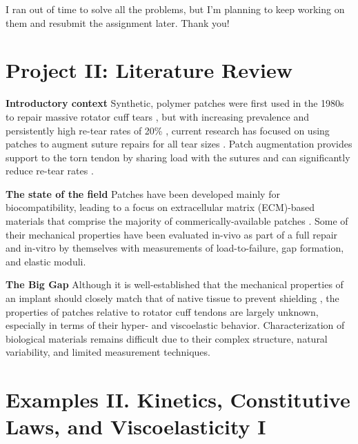 \documentclass{article}
\begin{document}
I ran out of time to solve all the problems, but I'm planning to keep working on them and resubmit the assignment later. Thank you!

\newpage


\section*{Project II: Literature Review}

\begin{outline}
    \1 \textbf{Introductory context}
        \2 Synthetic, polymer patches were first used in the 1980s to repair massive rotator cuff tears \cite{ozaki1986reconstruction}, but with increasing prevalence \cite{yamaguchi2006demographic} and persistently high re-tear rates of 20\% \cite{longo2021retear}, current research has focused on using patches to augment suture repairs for all tear sizes \cite{cobb2022rotator}. Patch augmentation provides support to the torn tendon by sharing load with the sutures \cite{shea2012biomechanical} and can significantly reduce re-tear rates \cite{de2022benefits}.
    
    \1 \textbf{The state of the field}
        \2 Patches have been developed mainly for biocompatibility, leading to a focus on extracellular matrix (ECM)-based materials that comprise the majority of commerically-available patches \cite{hakimi2013synthetic}. Some of their mechanical properties have been evaluated in-vivo as part of a full repair \cite{barber2008ultimate, mehta2020biomechanical} and in-vitro by themselves \cite{derwin2006commercial, chaudhury2012tensile} with measurements of load-to-failure, gap formation, and elastic moduli.
        
    \1 \textbf{The Big Gap}
        \2 Although it is well-established that the mechanical properties of an implant should closely match that of native tissue to prevent shielding \cite{vunjak2004tissue}, the properties of patches relative to rotator cuff tendons are largely unknown, especially in terms of their hyper- and viscoelastic behavior. Characterization of biological materials remains difficult due to their complex structure, natural variability, and limited measurement techniques.
\end{outline}




\newpage


\section*{Examples II. Kinetics, Constitutive Laws, and Viscoelasticity I}
\end{document}
